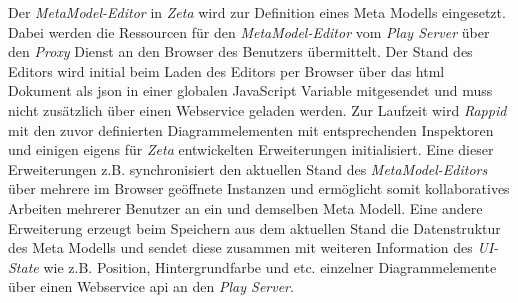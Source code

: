 Der \textit{MetaModel-Editor} in \textit{Zeta} wird zur Definition eines Meta Modells eingesetzt. Dabei werden die Ressourcen für den \textit{MetaModel-Editor} vom \textit{Play Server} über den \textit{Proxy} Dienst an den Browser des Benutzers übermittelt. Der Stand des Editors wird initial beim Laden des Editors per Browser über das \ac{html} Dokument als \ac{json} in einer globalen JavaScript Variable mitgesendet und muss nicht zusätzlich über einen Webservice geladen werden. Zur Laufzeit wird \textit{Rappid} mit den zuvor definierten Diagrammelementen mit entsprechenden Inspektoren und einigen eigens für \textit{Zeta} entwickelten Erweiterungen initialisiert. Eine dieser Erweiterungen z.B. synchronisiert den aktuellen Stand des \textit{MetaModel-Editors} über mehrere im Browser geöffnete Instanzen und ermöglicht somit kollaboratives Arbeiten mehrerer Benutzer an ein und demselben Meta Modell. Eine andere Erweiterung erzeugt beim Speichern aus dem aktuellen Stand die Datenstruktur des Meta Modells und sendet diese zusammen mit weiteren Information des \textit{UI-State} wie z.B. Position, Hintergrundfarbe und etc. einzelner Diagrammelemente über einen Webservice \ac{api} an den \textit{Play Server}.

